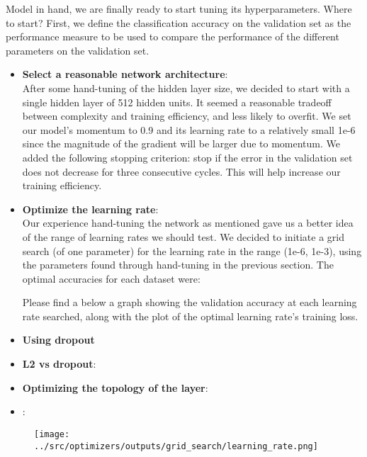Model in hand, we are finally ready to start tuning its hyperparameters. Where to start?
First, we define the classification accuracy on the validation set as
the performance measure to be used to compare the performance of the different parameters on the validation set.

\begin{itemize}
\item \textbf{Select a reasonable network architecture}:\\
  After some hand-tuning of the hidden layer size, we decided to start with a single hidden layer of 512 hidden units.
  It seemed a reasonable tradeoff between complexity and training efficiency, and less likely to overfit.
  We set our model's momentum to 0.9 and its learning rate to a relatively small 1e-6
  since the magnitude of the gradient will be larger due to momentum.
  We added the following stopping criterion: stop if the error in the validation set does not decrease for three consecutive cycles.
  This will help increase our training efficiency.

\item \textbf{Optimize the learning rate}:\\
  Our experience hand-tuning the network as mentioned gave us a better idea of the range of learning rates we should test.
  We decided to initiate a grid search (of one parameter) for the learning rate in the range (1e-6, 1e-3),
  using the parameters found through hand-tuning in the previous section.
  The optimal accuracies for each dataset were:
  
  Please find a below a graph showing the validation accuracy at each learning rate searched,
  along with the plot of the optimal learning rate's training loss. 

\item \textbf{Using dropout}\\


\item \textbf{L2 vs dropout}:\\

\item \textbf{Optimizing the topology of the layer}:\\  
  
\item {}:\\
\end{itemize}
  

\begin{figure}[!ht]
  \centering
      {{\texttt{[image: ../src/optimizers/outputs/grid\_search/learning\_rate.png]}}}
\end{figure}

